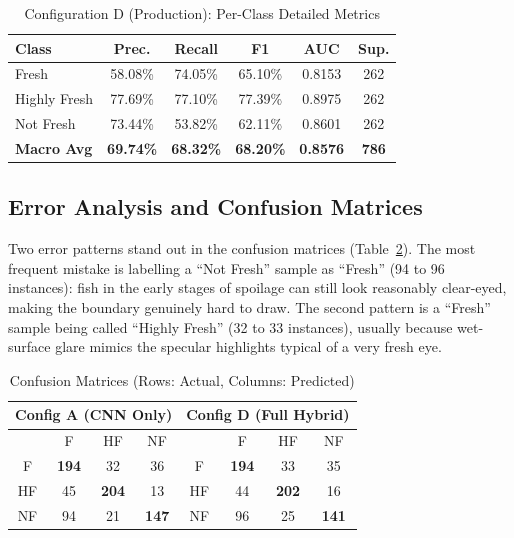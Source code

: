 \documentclass[conference]{IEEEtran}
\begin{document}
\begin{table}[h]
\centering
\caption{Configuration D (Production): Per-Class Detailed Metrics}
\label{tab:config_d_detail}
\begin{tabular}{lccccc}
\toprule
\textbf{Class} & \textbf{Prec.} & \textbf{Recall} & \textbf{F1} & \textbf{AUC} & \textbf{Sup.} \\
\midrule
Fresh & 58.08\% & 74.05\% & 65.10\% & 0.8153 & 262 \\
Highly Fresh & 77.69\% & 77.10\% & 77.39\% & 0.8975 & 262 \\
Not Fresh & 73.44\% & 53.82\% & 62.11\% & 0.8601 & 262 \\
\midrule
\textbf{Macro Avg} & \textbf{69.74\%} & \textbf{68.32\%} & \textbf{68.20\%} & \textbf{0.8576} & \textbf{786} \\
\bottomrule
\end{tabular}
\end{table}

\subsection{Error Analysis and Confusion Matrices}
Two error patterns stand out in the confusion matrices (Table~\ref{tab:confusion}). The most frequent mistake is labelling a ``Not Fresh'' sample as ``Fresh'' (94 to 96 instances): fish in the early stages of spoilage can still look reasonably clear-eyed, making the boundary genuinely hard to draw. The second pattern is a ``Fresh'' sample being called ``Highly Fresh'' (32 to 33 instances), usually because wet-surface glare mimics the specular highlights typical of a very fresh eye.

\begin{table}[h]
\centering
\caption{Confusion Matrices (Rows: Actual, Columns: Predicted)}
\label{tab:confusion}
\begin{tabular}{c|ccc|c|ccc}
\toprule
\multicolumn{4}{c|}{\textbf{Config A (CNN Only)}} & \multicolumn{4}{c}{\textbf{Config D (Full Hybrid)}} \\
\midrule
& F & HF & NF & & F & HF & NF \\
\midrule
F & \textbf{194} & 32 & 36 & F & \textbf{194} & 33 & 35 \\
HF & 45 & \textbf{204} & 13 & HF & 44 & \textbf{202} & 16 \\
NF & 94 & 21 & \textbf{147} & NF & 96 & 25 & \textbf{141} \\
\bottomrule
\end{tabular}
\end{table}
\end{document}
